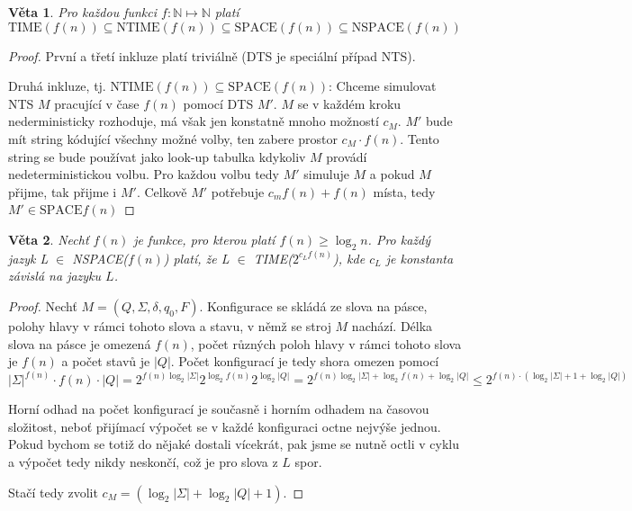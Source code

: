 \documentclass[11pt]{report} %
\newcommand{\N}{\mathbb{N}}
\newtheorem{theorem}{Věta}[section]
\begin{document}
\begin{theorem}
\label{complexity_basic}
Pro každou funkci $f : \N \mapsto \N$ platí 
$$\text{TIME}(f(n)) \subseteq \text{NTIME}(f(n)) \subseteq \text{SPACE}(f(n)) \subseteq \text{NSPACE}(f(n))$$
\end{theorem}
\begin{proof}
První a třetí inkluze platí triviálně (DTS je speciální případ NTS). 

Druhá inkluze, tj. $\text{NTIME}(f(n)) \subseteq \text{SPACE}(f(n))$: Chceme simulovat NTS $M$ pracující v čase $f(n)$ pomocí DTS $M'$. $M$ se v každém kroku nederministicky rozhoduje, má však jen konstatně mnoho možností $c_M$. $M'$ bude mít string kódující všechny možné volby, ten zabere prostor $c_M\cdot f(n)$. Tento string se bude používat jako look-up tabulka kdykoliv $M$ provádí nedeterministickou volbu. Pro každou volbu tedy $M'$ simuluje $M$ a pokud $M$ přijme, tak přijme i $M'$. Celkově $M'$ potřebuje $c_mf(n) + f(n)$ místa, tedy $M' \in \text{SPACE}f(n)$
\end{proof}

\begin{theorem}
\label{complexity_nspace_time}
Nechť $f(n)$ je funkce, pro kterou platí $f(n) \geq \log_2n$. Pro každý jazyk L $\in$ NSPACE($f(n)$) platí, že L $\in$ TIME($2^{c_L f(n)}$), kde $c_L$ je konstanta závislá na jazyku $L$.
\end{theorem}
\begin{proof}
Nechť $M = (Q, \Sigma, \delta, q_0, F)$. Konfigurace se skládá ze slova na pásce, polohy hlavy v rámci tohoto slova a stavu, v němž se stroj $M$ nachází. Délka slova na pásce je omezená $f(n)$, počet různých poloh hlavy v rámci tohoto slova je $f(n)$ a počet stavů je $|Q|$. Počet konfigurací je tedy shora omezen pomocí
$$|\Sigma|^{f(n)}\cdot f(n)\cdot |Q| = 2^{f(n) \log_2 |\Sigma|}2^{\log_2 f(n)}2^{\log_2|Q|} = 2^{f(n) \log_2 |\Sigma|+\log_2 f(n) + \log_2 |Q|} \leq 2^{f(n)·(\log_2 |\Sigma|+1+\log_2 |Q|)}$$

Horní odhad na počet konfigurací je současně i horním odhadem na časovou složitost, neboť přijímací výpočet se v každé konfiguraci octne nejvýše jednou. Pokud bychom se totiž do nějaké dostali vícekrát, pak jsme se nutně octli v cyklu a výpočet tedy nikdy neskončí, což je pro slova z $L$ spor.

Stačí tedy zvolit $c_M = (\log_2 |\Sigma| + \log_2 |Q| + 1)$. 
\end{proof}
\end{document}
